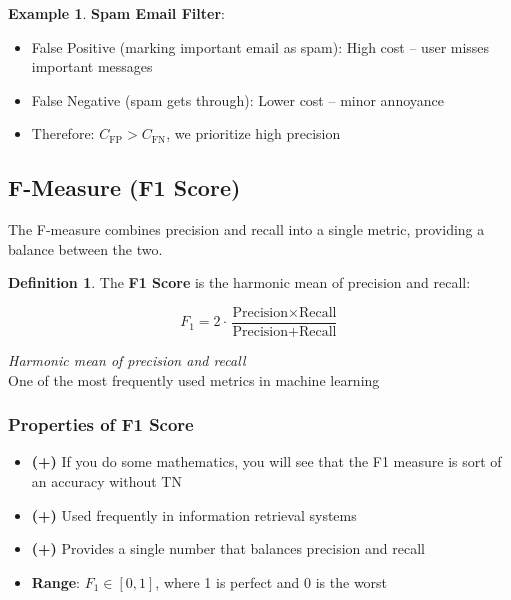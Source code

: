\documentclass[11pt,a4paper]{article}
\theoremstyle{definition}
\newtheorem{definition}{Definition}[section]
\newtheorem{example}{Example}[section]
\theoremstyle{plain}
\theoremstyle{remark}
\begin{document}
\begin{example}
\textbf{Spam Email Filter}:
\begin{itemize}
    \item False Positive (marking important email as spam): High cost – user misses important messages
    \item False Negative (spam gets through): Lower cost – minor annoyance
    \item Therefore: $C_{\text{FP}} > C_{\text{FN}}$, we prioritize high precision
\end{itemize}
\end{example}

\subsection{F-Measure (F1 Score)}

The F-measure combines precision and recall into a single metric, providing a balance between the two.

\begin{definition}
The \textbf{F1 Score} is the harmonic mean of precision and recall:

\begin{equation}
F_1 = 2 \cdot \frac{\text{Precision} \times \text{Recall}}{\text{Precision} + \text{Recall}}
\end{equation}
\end{definition}

\begin{center}
\colorbox{green!15}{\parbox{0.8\textwidth}{
\centering
\textit{Harmonic mean of precision and recall}\\[0.1cm]
One of the most frequently used metrics in machine learning
}}
\end{center}

\subsubsection{Properties of F1 Score}

\begin{itemize}
    \item \textbf{(+)} If you do some mathematics, you will see that the F1 measure is sort of an accuracy without TN
    \item \textbf{(+)} Used frequently in information retrieval systems
    \item \textbf{(+)} Provides a single number that balances precision and recall
    \item \textbf{Range}: $F_1 \in [0, 1]$, where 1 is perfect and 0 is the worst
\end{itemize}
\end{document}
